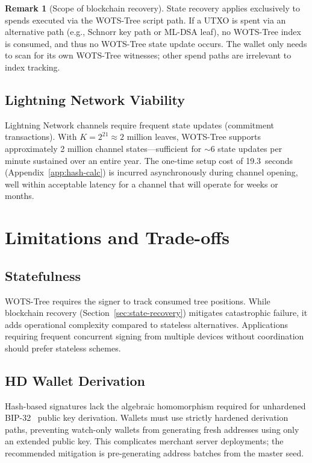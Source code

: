 \documentclass[11pt,a4paper]{article}
\theoremstyle{definition}
\newtheorem{remark}[theorem]{Remark}
\begin{document}
\begin{remark}[Scope of blockchain recovery]
State recovery applies exclusively to spends executed via the WOTS-Tree script path. If a UTXO is spent via an alternative path (e.g., Schnorr key path or ML-DSA leaf), no WOTS-Tree index is consumed, and thus no WOTS-Tree state update occurs. The wallet only needs to scan for its own WOTS-Tree witnesses; other spend paths are irrelevant to index tracking.
\end{remark}

\subsection{Lightning Network Viability}
\label{sec:lightning}

Lightning Network channels require frequent state updates (commitment transactions). With $K = 2^{21} \approx 2$ million leaves, WOTS-Tree supports approximately 2 million channel states---sufficient for $\sim$6 state updates per minute sustained over an entire year. The one-time setup cost of 19.3~seconds (Appendix~\ref{app:hash-calc}) is incurred asynchronously during channel opening, well within acceptable latency for a channel that will operate for weeks or months.

\section{Limitations and Trade-offs}
\label{sec:limitations}

\subsection{Statefulness}
WOTS-Tree requires the signer to track consumed tree positions. While blockchain recovery (Section~\ref{sec:state-recovery}) mitigates catastrophic failure, it adds operational complexity compared to stateless alternatives. Applications requiring frequent concurrent signing from multiple devices without coordination should prefer stateless schemes.

\subsection{HD Wallet Derivation}
Hash-based signatures lack the algebraic homomorphism required for unhardened BIP-32~\cite{bip32} public key derivation. Wallets must use strictly hardened derivation paths, preventing watch-only wallets from generating fresh addresses using only an extended public key. This complicates merchant server deployments; the recommended mitigation is pre-generating address batches from the master seed.
\end{document}
